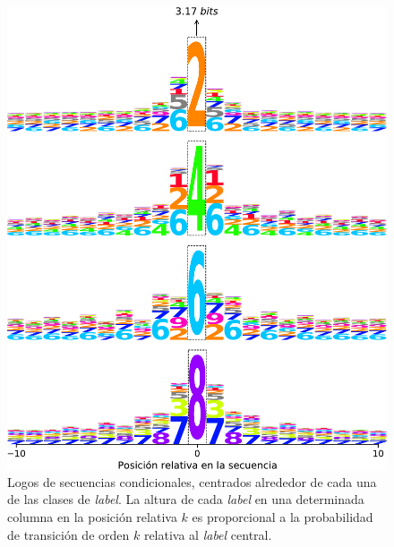 \begin{landscape}
\begin{figure}[!htbp]
\begin{minipage}{0.42\linewidth}
    \includegraphics[width=1\linewidth]{figuras/expertos/logos/conditional_logos_even.pdf}
    \caption{Logos de secuencias condicionales, centrados alrededor de cada una de las clases de \textit{label}. La altura de cada \textit{label} en una determinada columna en la posición relativa $k$ es proporcional a la probabilidad de transición de orden $k$ relativa al \textit{label} central.}
    \label{fig:logos}
\end{minipage}
\end{figure}
\end{landscape}
